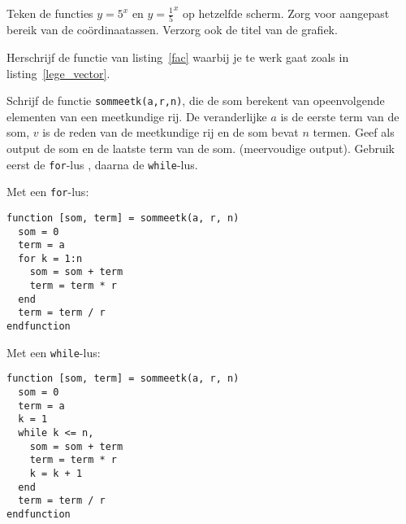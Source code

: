 \begin{oef}
Teken de functies $y = 5^x$ en $y = \frac15^x$
op hetzelfde scherm. 
Zorg voor aangepast bereik van de co\"ordinaatassen. Verzorg ook de titel van de grafiek.
\end{oef} 


\begin{oef}
Herschrijf de functie van listing~\ref{fac} waarbij je te werk gaat zoals in listing~\ref{lege_vector}.
\end{oef}

\begin{oef}
Schrijf de functie  \verb/sommeetk(a,r,n)/, die de som berekent van opeenvolgende elementen van een meetkundige rij.
De veranderlijke $a$ is de eerste term van de som, $v$ is de reden van de meetkundige rij en de som 
bevat $n$ termen. Geef als output  de som en de laatste term van de som.
(meervoudige output). Gebruik eerst de \verb/for/-lus , daarna  de \verb/while/-lus.
\begin{opl}
\begin{samepage}
Met een {\tt for}-lus:
\begin{lstlisting}
function [som, term] = sommeetk(a, r, n)
  som = 0
  term = a
  for k = 1:n
    som = som + term
    term = term * r
  end
  term = term / r
endfunction
\end{lstlisting}
\end{samepage}
\begin{samepage}
Met een {\tt while}-lus:
\begin{lstlisting}
function [som, term] = sommeetk(a, r, n)
  som = 0
  term = a
  k = 1
  while k <= n,
    som = som + term
    term = term * r
    k = k + 1
  end
  term = term / r
endfunction
\end{lstlisting}
\end{samepage}
\end{opl}
\end{oef}


